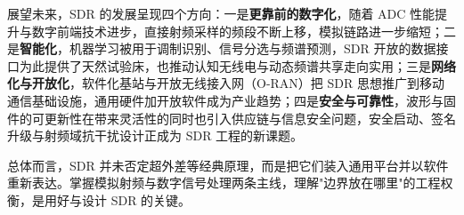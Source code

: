 展望未来，SDR 的发展呈现四个方向：一是\textbf{更靠前的数字化}，随着 ADC 性能提升与数字前端技术进步，直接射频采样的频段不断上移，模拟链路进一步缩短；二是\textbf{智能化}，机器学习被用于调制识别、信号分选与频谱预测，SDR 开放的数据接口为此提供了天然试验床，也推动认知无线电与动态频谱共享走向实用；三是\textbf{网络化与开放化}，软件化基站与开放无线接入网（O-RAN）把 SDR 思想推广到移动通信基础设施，通用硬件加开放软件成为产业趋势；四是\textbf{安全与可靠性}，波形与固件的可更新性在带来灵活性的同时也引入供应链与信息安全问题，安全启动、签名升级与射频域抗干扰设计正成为 SDR 工程的新课题。

总体而言，SDR 并未否定超外差等经典原理，而是把它们装入通用平台并以软件重新表达。掌握模拟射频与数字信号处理两条主线，理解"边界放在哪里"的工程权衡，是用好与设计 SDR 的关键。
